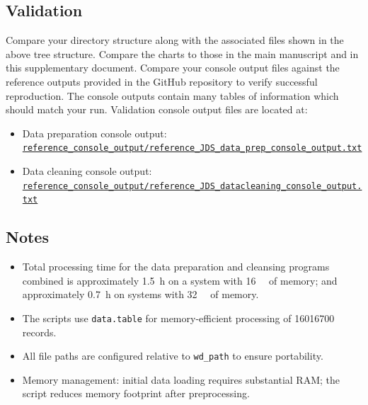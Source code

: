 \documentclass[linenumber]{jdsart}
\begin{document}
\subsection*{Validation}


Compare your directory structure along with the associated files shown
in the above tree structure. Compare the charts to those in the main 
manuscript and in this supplementary document. Compare your console 
output files against the reference outputs provided in the GitHub 
repository to verify successful reproduction. The console outputs
contain many tables of information which should match your 
run. Validation console output files are located at:


\begin{itemize}
\item Data preparation console output: \\ \href{https://github.com/tusseyd/nyc_311_data_cleaning/blob/main/reference_console_output/reference_JDS_data_prep_console_output.txt}{\texttt{reference\_console\_output/reference\_JDS\_data\_prep\_console\_output.txt}}
 \item Data cleaning console output: \\ \href{https://github.com/tusseyd/nyc_311_data_cleaning/blob/main/reference_console_output/reference_JDS_datacleaning_console_output.txt}{\texttt{reference\_console\_output/reference\_JDS\_datacleaning\_console\_output.txt}}
\end{itemize}


\subsection*{Notes}


\begin{itemize}
\item Total processing time for the data preparation and cleansing programs 
combined is approximately \SI{1.5}{\hour}
on a system with \SI{16}{\giga\byte} of memory; and approximately \SI{0.7}{\hour}
on systems with \SI{32}{\giga\byte} of memory.
\item The scripts use \texttt{data.table} \citep{datatable2025} for memory-efficient processing
of \num{16016700} records.
\item All file paths are configured relative to \texttt{wd\_path}
to ensure portability.
\item Memory management: initial data loading requires substantial RAM;
the script reduces memory footprint after preprocessing.
\end{itemize}




\end{document}

